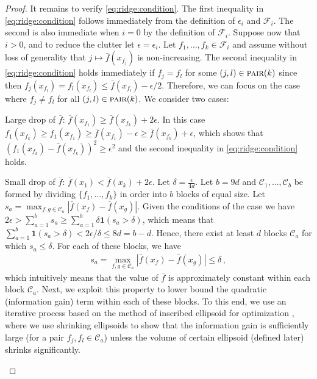 \documentclass[letter, 12pt]{report}
\newcommand{\pair}{\operatorname{\textsc{pair}}}
\newcommand{\cC}{\mathcal C}
\newcommand{\sF}{\mathscr F}
\newcommand{\sind}{\bm{1}}
\newcommand{\1}{\mathbf{1}}
\theoremstyle{plain}
\theoremstyle{definition}
\theoremstyle{remark}
\begin{document}
\begin{proof}
    It remains to verify \cref{eq:ridge:condition}.
    The first inequality in \cref{eq:ridge:condition} follows immediately from the definition of $\epsilon_i$ and $\sF_i$. The second is also immediate when $i = 0$ by the definition of $\sF_i$.
    Suppose now that $i > 0$, and to reduce the clutter let $\epsilon = \epsilon_i$.
    Let $f_1,\ldots,f_k \in \sF_i$ and
    assume without loss of generality that $j \mapsto \bar f(x_{f_j})$ is non-increasing.
    The second inequality in \cref{eq:ridge:condition} holds immediately if $f_j = f_l$ for some $(j,l) \in \pair(k)$ since then $f_j(x_{f_l}) = f_l(x_{f_l}) \leq \bar f(x_{f_l}) - \epsilon/2$.
    Therefore, we can focus on the case where $f_j \neq f_l$ for all $(j,l) \in \pair(k)$. We consider two cases:
    \begin{enumcases}
        \item Large drop of $\bar{f}$: $\bar f(x_{f_1}) \geq \bar f(x_{f_k}) + 2\epsilon$. In this case
        $f_1(x_{f_k}) \geq f_1(x_{f_1}) \geq \bar f(x_{f_1}) - \epsilon \geq \bar f(x_{f_k}) + \epsilon$,
        which shows that $(f_1(x_{f_k}) - \bar f(x_{f_k}))^2 \geq \epsilon^2$ and the second inequality in \cref{eq:ridge:condition} holds.
        \item Small drop of $\bar{f}$: $\bar f(x_1) < \bar f(x_k) + 2\epsilon$. Let $\delta = \frac{\epsilon}{4d}$.
        Let $b = 9d$ and $\cC_1,\ldots,\cC_b$ be formed by dividing $\{f_1,\ldots,f_k\}$ in order into $b$ blocks of equal size.
        Let $s_a = \max_{f,g \in \cC_a} |\bar f(x_f) - \bar f(x_g)|$.
        Given the conditions of the case we have $2\epsilon > \sum_{a=1}^b s_a \geq \sum_{a=1}^b \delta \sind(s_a > \delta)$,
        which means that $\sum_{a=1}^b \sind(s_a > \delta) < 2\epsilon / \delta \leq 8d = b - d$.
        Hence, there exist at least $d$ blocks $\cC_a$ for which $s_a \leq \delta$.
        For each of these blocks, we have
        \begin{align*}
            s_a = \max_{f,g \in \cC_a} |\bar f(x_f) - \bar f(x_g)| \leq \delta\,,
        \end{align*}
        which intuitively means that the value of $\bar{f}$ is approximately constant within each block $\cC_a$.
        Next, we exploit this property to lower bound the quadratic (information gain) term within each of these blocks.
        To this end, we use an iterative process based on the method of inscribed ellipsoid for optimization \citep{tarasov1988method}, where we use shrinking ellipsoids to show that the information gain is sufficiently large (for a pair $f_j, f_l \in \cC_a$) unless the volume of certain ellipsoid (defined later) shrinks significantly.


\end{enumcases}
\end{proof}
\end{document}
